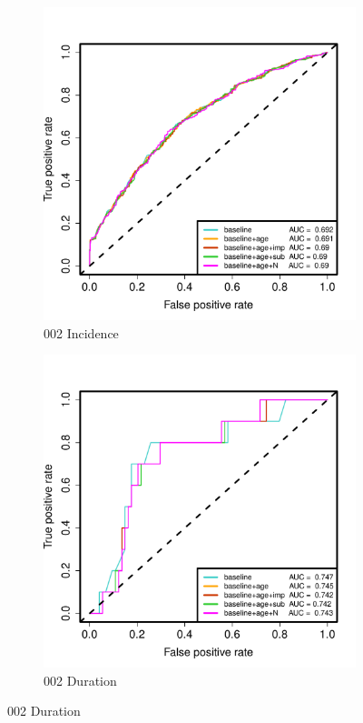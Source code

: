 \documentclass[12pt,twoside]{article}
\begin{document}
        
 
    \begin{figure}[h]
        \centering
        
        \begin{subfigure}{.475\textwidth}
            \includegraphics[width=\textwidth]{002Incidence_AUC_constrained.pdf}
            \caption{002 Incidence}
        \end{subfigure}\hfill
                \begin{subfigure}{.475\textwidth}
            \includegraphics[width=\textwidth]{002Duration_AUC_constrained.pdf}
            \caption{002 Duration}
        \end{subfigure}\hfill
        

\end{figure}
\end{document}
